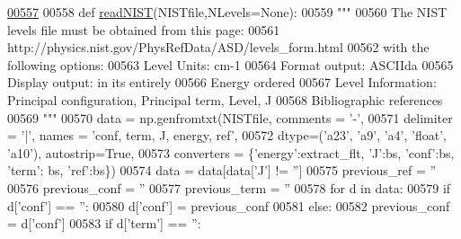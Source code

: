 \begin{DoxyCode}
\hypertarget{namespacepyneb_1_1utils_1_1manage__atomic__data_l00557}{}\hyperlink{namespacepyneb_1_1utils_1_1manage__atomic__data_a7cc94dc359981610066c8212bf4aed51}{00557} 
00558 \textcolor{keyword}{def }\hyperlink{namespacepyneb_1_1utils_1_1manage__atomic__data_a7cc94dc359981610066c8212bf4aed51}{readNIST}(NISTfile,NLevels=None):
00559     \textcolor{stringliteral}{"""}
00560 \textcolor{stringliteral}{    The NIST levels file must be obtained from this page:}
00561 \textcolor{stringliteral}{        http://physics.nist.gov/PhysRefData/ASD/levels\_form.html}
00562 \textcolor{stringliteral}{    with the following options:}
00563 \textcolor{stringliteral}{        Level Units: cm-1}
00564 \textcolor{stringliteral}{        Format output: ASCIIda}
00565 \textcolor{stringliteral}{        Display output: in its entirely}
00566 \textcolor{stringliteral}{        Energy ordered}
00567 \textcolor{stringliteral}{        Level Information: Principal configuration, Principal term, Level, J}
00568 \textcolor{stringliteral}{        Bibliographic references}
00569 \textcolor{stringliteral}{    """}
00570     data = np.genfromtxt(NISTfile, comments = \textcolor{stringliteral}{'-'}, 
00571                     delimiter = \textcolor{stringliteral}{'|'}, names = \textcolor{stringliteral}{'conf, term, J, energy, ref'}, 
00572                     dtype=(\textcolor{stringliteral}{'a23'}, \textcolor{stringliteral}{'a9'}, \textcolor{stringliteral}{'a4'}, \textcolor{stringliteral}{'float'}, \textcolor{stringliteral}{'a10'}), autostrip=\textcolor{keyword}{True},
00573                     converters = \{\textcolor{stringliteral}{'energy'}:extract\_flt, \textcolor{stringliteral}{'J'}:bs, \textcolor{stringliteral}{'conf'}:bs, \textcolor{stringliteral}{'term'}: bs, \textcolor{stringliteral}{'ref'}:bs\})
00574     data = data[data[\textcolor{stringliteral}{'J'}] != \textcolor{stringliteral}{''}]
00575     previous\_ref = \textcolor{stringliteral}{''}
00576     previous\_conf = \textcolor{stringliteral}{''}
00577     previous\_term = \textcolor{stringliteral}{''}
00578     \textcolor{keywordflow}{for} d \textcolor{keywordflow}{in} data:
00579         \textcolor{keywordflow}{if} d[\textcolor{stringliteral}{'conf'}] == \textcolor{stringliteral}{''}:
00580             d[\textcolor{stringliteral}{'conf'}] = previous\_conf
00581         \textcolor{keywordflow}{else}:
00582             previous\_conf = d[\textcolor{stringliteral}{'conf'}]
00583         \textcolor{keywordflow}{if} d[\textcolor{stringliteral}{'term'}] == \textcolor{stringliteral}{''}:

\end{DoxyCode}
